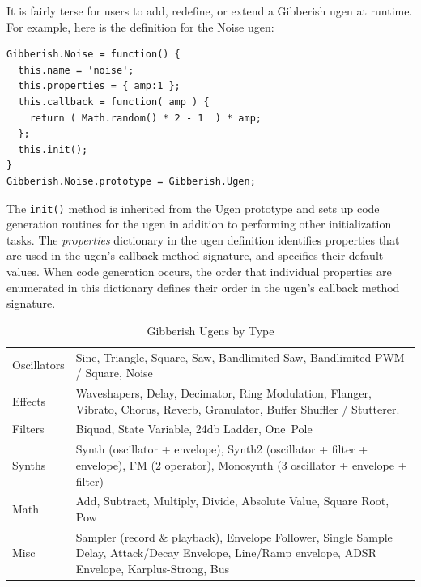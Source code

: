 It is fairly terse for users to add, redefine, or extend a Gibberish ugen at runtime. For example, here is the definition for the Noise ugen:

{\small {\begin{verbatim}
Gibberish.Noise = function() {
  this.name = 'noise';
  this.properties = { amp:1 };
  this.callback = function( amp ) {
    return ( Math.random() * 2 - 1  ) * amp;
  };
  this.init();
}
Gibberish.Noise.prototype = Gibberish.Ugen;
\end{verbatim}}}

The \texttt{init()} method is inherited from the Ugen prototype and sets up code generation routines for the ugen in addition to performing other initialization tasks. The \emph{properties} dictionary in the ugen definition identifies properties that are used in the ugen's callback method signature, and specifies their default values. When code generation occurs, the order that individual properties are enumerated in this dictionary defines their order in the ugen's callback method signature.

\begin{table}[t]
\centering
\caption{Gibberish Ugens by Type}
\begin{tabular}[hb]{l | l}
\hline
Oscillators & \begin{minipage}[t]{0.75\columnwidth} Sine, Triangle, Square, Saw, Bandlimited Saw, Bandlimited PWM / Square, Noise \end{minipage} \\
\rule{0pt}{3ex}
Effects & \begin{minipage}[t]{0.75\columnwidth} Waveshapers, Delay, Decimator, Ring Modulation, Flanger, Vibrato, Chorus, Reverb, Granulator, Buffer Shuffler / Stutterer. \end{minipage} \\
\rule{0pt}{3ex}
Filters & \begin{minipage}[t]{0.75\columnwidth} Biquad, State Variable, 24db Ladder, One~Pole \end{minipage} \\
\rule{0pt}{3ex}
Synths & \begin{minipage}[t]{0.75\columnwidth} Synth (oscillator + envelope), Synth2 (oscillator + filter + envelope), FM (2 operator), Monosynth (3 oscillator + envelope + filter) \end{minipage} \\
\rule{0pt}{3ex}
Math & \begin{minipage}[t]{0.75\columnwidth} Add, Subtract, Multiply, Divide, Absolute Value, Square Root, Pow \end{minipage} \\
\rule{0pt}{3ex}
Misc & \begin{minipage}[t]{0.75\columnwidth} Sampler (record \& playback), Envelope Follower, Single Sample Delay, Attack/Decay Envelope, Line/Ramp envelope, ADSR Envelope, Karplus-Strong, Bus \end{minipage} \\
\end{tabular}
\label{Roberts:tab:ugens}
\end{table}

